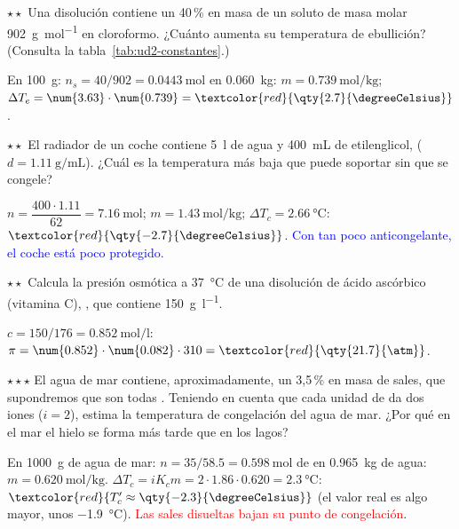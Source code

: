 \begin{exercise}
    \(\star\star\) Una disolución contiene un 40\,\% en masa de un soluto de masa molar \qty{902}{\gram\per\mol} en cloroformo.
    ¿Cuánto aumenta su temperatura de ebullición? (Consulta la tabla~\ref{tab:ud2-constantes}.)
    \begin{solu}
        En \qty{100}{\gram}: \(n_s = 40/902 = \qty{0.0443}{\mol}\) en \qty{0.060}{\kilo\gram}: \(m = \qty{0.739}{\mol\per\kilo\gram}\);
        \(\Delta T_e = \num{3.63} \cdot \num{0.739} = \textcolor{red}{\qty{2.7}{\degreeCelsius}}\).
    \end{solu}
\end{exercise}

\begin{exercise}
    \(\star\star\) El radiador de un coche contiene \qty{5}{\litre} de agua y \qty{400}{\mL} de etilenglicol, 
    (\(d = \qty{1.11}{\gram\per\mL}\)). ¿Cuál es la temperatura más baja que puede soportar sin que se congele?
    \begin{solu}
        \(n = \dfrac{400 \cdot \num{1.11}}{62} = \qty{7.16}{\mol}\); \(m = \qty{1.43}{\mol\per\kilo\gram}\); \(\Delta T_c = \qty{2.66}{\degreeCelsius}\):
        \(\textcolor{red}{\qty{-2.7}{\degreeCelsius}}\). \textcolor{blue}{Con tan poco anticongelante, el coche está poco protegido.}
    \end{solu}
\end{exercise}

\begin{exercise}
    \(\star\star\) Calcula la presión osmótica a \qty{37}{\degreeCelsius} de una disolución de ácido ascórbico (vitamina C),
    , que contiene \qty{150}{\gram\per\litre}.
    \begin{solu}
        \(c = 150/176 = \qty{0.852}{\mol\per\litre}\): \(\pi = \num{0.852} \cdot \num{0.082} \cdot 310 = \textcolor{red}{\qty{21.7}{\atm}}\).
    \end{solu}
\end{exercise}

\begin{exercise}
    \(\star\star\star\) El agua de mar contiene, aproximadamente, un 3,5\,\% en masa de sales, que supondremos que son todas
    . Teniendo en cuenta que cada unidad de  da dos iones (\(i = 2\)), estima la temperatura de congelación del
    agua de mar. ¿Por qué en el mar el hielo se forma más tarde que en los lagos?
    \begin{solu}
        En \qty{1000}{\gram} de agua de mar: \(n = 35/\num{58.5} = \qty{0.598}{\mol}\) de  en \qty{0.965}{\kilo\gram} de agua:
        \(m = \qty{0.620}{\mol\per\kilo\gram}\). \(\Delta T_c = i K_c m = 2 \cdot \num{1.86} \cdot \num{0.620} = \qty{2.3}{\degreeCelsius}\):
        \(\textcolor{red}{T_c' \approx \qty{-2.3}{\degreeCelsius}}\) (el valor real es algo mayor, unos \qty{-1.9}{\degreeCelsius}).
        \textcolor{red}{Las sales disueltas bajan su punto de congelación}.
    \end{solu}
\end{exercise}

